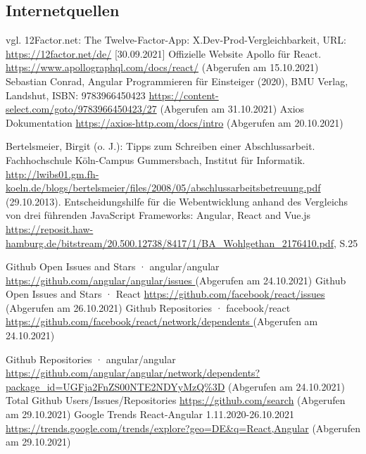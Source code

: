 \subsection{Internetquellen}
\begin{thebibliography}{HR08} %

 vgl. 12Factor.net: The Twelve-Factor-App: X.Dev-Prod-Vergleichbarkeit, URL: \url{https://12factor.net/de/} [30.09.2021]
Offizielle Website Apollo für React. \url{https://www.apollographql.com/docs/react/} (Abgerufen am 15.10.2021)
 Sebastian Conrad, Angular Programmieren für Einsteiger (2020), BMU Verlag, Landshut, ISBN: 9783966450423 \url{https://content-select.com/goto/9783966450423/27} (Abgerufen am 31.10.2021)
Axios Dokumentation \url{https://axios-http.com/docs/intro} (Abgerufen am 20.10.2021)

Bertelsmeier, Birgit (o. J.): Tipps zum Schrei\-b\-en ei\-n\-er Ab\-sch\-luss\-ar\-beit. Fach\-hoch\-schu\-le Köln-Campus Gummersbach, Institut für Informatik. \url{http://lwibs01.gm.fh-koeln.de/blogs/bertelsmeier/files/2008/05/abschlussarbeitsbetreuung.pdf} (29.10.2013).
Entscheidungshilfe für die Webentwicklung anhand des Vergleichs von drei führenden JavaScript Frameworks: Angular, React and Vue.js \url{https://reposit.haw-hamburg.de/bitstream/20.500.12738/8417/1/BA_Wohlgethan_2176410.pdf}, S.25


Github Open Issues and Stars · angular/angular \url{ https://github.com/angular/angular/issues }  (Abgerufen am 24.10.2021)
 Github Open Issues and Stars · React \url{https://github.com/facebook/react/issues} (Abgerufen am 26.10.2021)
 Github Repositories · facebook/react \url{ https://github.com/facebook/react/network/dependents } (Abgerufen am 24.10.2021)

 Github Repositories · angular/angular \url{https://github.com/angular/angular/network/dependents?package_id=UGFja2FnZS00NTE2NDYyMzQ%3D}  (Abgerufen am 24.10.2021)
 Total Github Users/Issues/Repositories \url{ https://github.com/search}  (Abgerufen am 29.10.2021)
Google Trends React-Angular 1.11.2020-26.10.2021 \url{https://trends.google.com/trends/explore?geo=DE&q=React,Angular} (Abgerufen am 29.10.2021)


\end{thebibliography}

